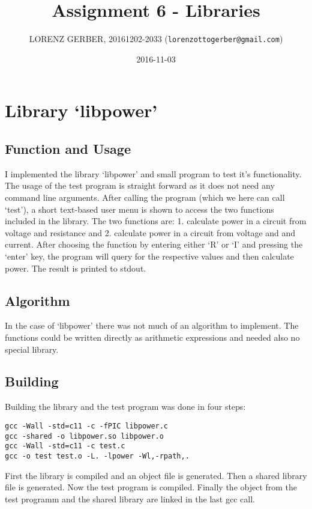 \documentclass[a4paper,11pt,twoside]{article}
\title{Assignment 6 - Libraries}
\author{LORENZ GERBER, 20161202-2033 ({\tt{lorenzottogerber@gmail.com}})}
\date{2016-11-03}
\begin{document}
\lstset{language=C}
\maketitle
\thispagestyle{empty}
\newpage

\clearpage
{}

\section{Library `libpower'}
\subsection{Function and Usage}
I implemented the library `libpower' and small program to test it's functionality. The usage of the test program is straight forward as it does not need any command line arguments. After calling the program (which we here can call `test'), a short text-based user menu is shown to access the two functions included in the library. The two functions are: 1. calculate power in a circuit from voltage and resistance and 2. calculate power in a circuit from voltage and and current. After choosing the function by entering either `R' or `I' and pressing the `enter' key, the program will query for the respective values and then calculate power. The result is printed to stdout.  

\subsection{Algorithm}
In the case of `libpower' there was not much of an algorithm to implement. The functions could be written directly as arithmetic expressions and needed also no special library.  

\subsection{Building}
Building the library and the test program was done in four steps:
\begin{verbatim}
gcc -Wall -std=c11 -c -fPIC libpower.c
gcc -shared -o libpower.so libpower.o
gcc -Wall -std=c11 -c test.c
gcc -o test test.o -L. -lpower -Wl,-rpath,.
\end{verbatim}
First the library is compiled and an object file is generated. Then a shared library file is generated. Now the test program is compiled. Finally the object from the test programm and the shared library are linked in the last gcc call. 
\end{document}
